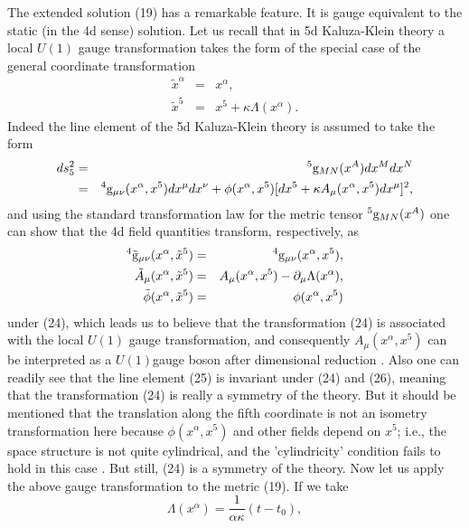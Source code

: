 \documentclass[a4paper,12pt]{article}
\begin{document}
The extended solution (19) has a remarkable feature. It is gauge
equivalent to the static (in the 4d sense) solution. Let us recall
that in 5d Kaluza-Klein theory a local $U(1)$ gauge transformation
takes the form of the special case of the general coordinate
transformation
\begin{eqnarray}
\tilde{x}^{\alpha} & = & x^{\alpha} ,\\
 \tilde{x}^5 & = & x^5 + \kappa \Lambda (x^{\alpha}). \nonumber
 \end{eqnarray}
 Indeed the line element of the 5d Kaluza-Klein
 theory is assumed to take the form
 \begin{eqnarray}
 ds^2_5 & = & {}^{5}{\rm g}_{MN}(x^A)dx^{M}dx^{N} \\
  & = & {}^{4}{\rm g}_{\mu \nu}(x^{\alpha},x^5)dx^{\mu}dx^{\nu} +
  \phi(x^{\alpha},x^5)[dx^5 + \kappa A_{\mu}(x^{\alpha},x^5)dx^
{\mu}]^2 ,\nonumber
  \end{eqnarray}
  and using the standard transformation law for the metric tensor
  ${}^5{\rm g}_{MN}(x^{A})$ one can show that the 4d
  field quantities transform, respectively, as
  \begin{eqnarray}
  {}^4{\rm {\tilde{g}}}_{\mu \nu}(x^{\alpha},\tilde{x}^5)
  &=&{}^4{\rm g}_{\mu \nu} (x^{\alpha}, x^5) ,\nonumber \\
  \tilde{A}_{\mu}(x^{\alpha},\tilde{x}^5)&=&A_{\mu}(x^{\alpha},x^5)
  -\partial_{\mu} \Lambda(x^{\alpha}), \\
  \tilde{\phi}(x^{\alpha},\tilde{x}^5) &=& \phi(x^{\alpha},x^5)
   \nonumber
  \end{eqnarray}
  under (24), which leads us to believe
  that  the transformation (24) is associated with the local $U(1)$ 
gauge
  transformation, and consequently $A_{\mu}(x^{\alpha},x^5)$ can be
  interpreted as a $U(1)$gauge boson after dimensional reduction .
  Also  one can readily see that the line element (25) is
  invariant under (24) and (26), meaning that the transformation
  (24) is really a symmetry of the theory. But it should be 
mentioned
  that the translation along the fifth coordinate is not an isometry
  transformation here because $\phi(x^{\alpha},x^5)$ and other 
fields depend on
  $x^5$; i.e., the space structure is not quite cylindrical, and
  the 'cylindricity' condition fails to hold in this case \cite
{ein}. But
  still, (24) is a symmetry of the theory.
  Now let us apply the above gauge transformation to
  the metric (19). If we take
  \begin{equation}
  \Lambda(x^{\alpha}) =\frac{1}{\alpha \kappa}( t-t_0)  ,
  \end{equation}
\end{document}

